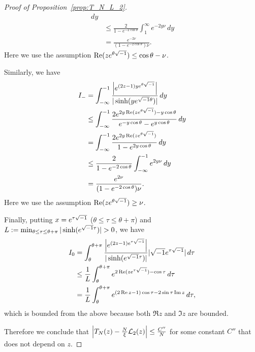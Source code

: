 \begin{proof}[Proof of Proposition~\ref{prop:T_N_L_2}]
\begin{equation*}
\begin{split}
  \,dy
  \\
  &\le
  \frac{2}{1-e^{-2\cos\theta}}
  \int_{1}^{\infty}
  e^{-2y\nu}\,dy
  \\
  &=
  \frac{e^{-2\nu}}{(1-e^{-2\cos\theta})\nu}.
\end{split}
\end{equation*}
Here we use the assumption $\operatorname{Re}(ze^{\theta\sqrt{-1}})\le\cos\theta-\nu$.
\par
Similarly, we have
\begin{equation*}
\begin{split}
  I_{-}
  &=
  \int_{-\infty}^{-1}
  \frac{\left|e^{(2z-1)ye^{\theta\sqrt{-1}}}\right|}{|\sinh(ye^{\sqrt{-1}\theta})|}
  \,dy
  \\
  &\le
  \int_{-\infty}^{-1}
  \frac{2e^{2y\operatorname{Re}(ze^{\theta\sqrt{-1}})-y\cos\theta}}{e^{-y\cos\theta}-e^{y\cos\theta}}
  \,dy
  \\
  &=
  \int_{-\infty}^{-1}
  \frac{2e^{2y\operatorname{Re}(ze^{\theta\sqrt{-1}})}}{1-e^{2y\cos\theta}}
  \,dy
  \\
  &\le
  \frac{2}{1-e^{-2\cos\theta}}
  \int_{-\infty}^{-1}
  e^{2y\nu}\,dy
  \\
  &=
  \frac{e^{2\nu}}{(1-e^{-2\cos\theta})\nu}.
\end{split}
\end{equation*}
Here we use the assumption $\operatorname{Re}(ze^{\theta\sqrt{-1}})\ge\nu$.
\par
Finally, putting $x=e^{\tau\sqrt{-1}}$ ($\theta\le\tau\le\theta+\pi$) and $L:=\min_{\theta\le\tau\le\theta+\pi}|\sinh(e^{\i\tau})|>0$, we have
\begin{equation*}
\begin{split}
  I_{0}
  &=
  \int_{\theta}^{\theta+\pi}
  \frac{\left|e^{(2z-1)e^{\tau\sqrt{-1}}}\right|}{|\sinh(e^{\sqrt{-1}\tau})|}
  |\sqrt{-1} e^{\tau\sqrt{-1}}|\,d\tau
  \\
  &\le
  \frac{1}{L}
  \int_{\theta}^{\theta+\pi}
  e^{2\operatorname{Re}(ze^{\tau\sqrt{-1}})-\cos\tau}
  \,d\tau
  \\
  &=
  \frac{1}{L}
  \int_{\theta}^{\theta+\pi}
  e^{(2\operatorname{Re}{z}-1)\cos\tau-2\sin\tau\operatorname{Im}{z}}
  \,d\tau,
\end{split}
\end{equation*}
which is bounded from the above because both $\Re{z}$ and $\Im{z}$ are bounded.
\par
Therefore we conclude that $\left|T_N(z)-\frac{N}{\xi}\mathcal{L}_2(z)\right|\le\frac{C''}{N}$ for some constant $C''$ that does not depend on $z$.
\end{proof}
